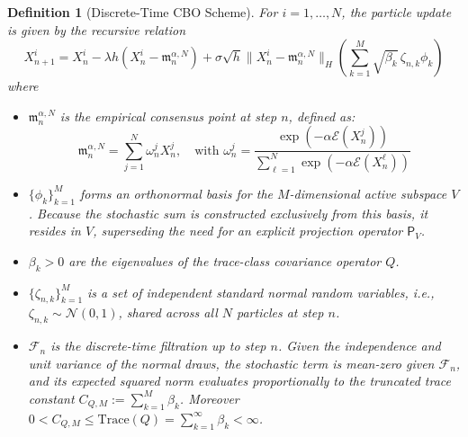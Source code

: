 \documentclass[12pt]{amsart}
\numberwithin{equation}{section}
\newtheorem{remark}[theorem]{Remark}
\newtheorem{definition}[theorem]{Definition}
\begin{document}
\begin{definition}[Discrete-Time CBO Scheme]\label{def}
For $i = 1, \dots, N$, the particle update is given by the recursive relation
\begin{equation}\label{eq:dynamics recursive}
    X_{n+1}^i = X_n^i - \lambda h (X_n^i - \mathfrak{m}_n^{\alpha, N}) + \sigma \sqrt{h} \|X_n^i - \mathfrak{m}_n^{\alpha, N}\|_H \left( \sum_{k=1}^M \sqrt{\beta_k}\, \zeta_{n,k} \phi_k \right)
\end{equation}
where
\begin{itemize}
    \item $\mathfrak{m}_n^{\alpha, N}$ is the empirical consensus point at step $n$, defined as:
    \begin{equation}
        \mathfrak{m}_n^{\alpha, N} = \sum_{j=1}^N \omega_n^j X_n^j, \quad \text{with } \omega_n^j = \frac{\exp(-\alpha \mathscr{E}(X_n^j))}{\sum_{\ell=1}^N \exp(-\alpha \mathscr{E}(X_n^\ell))}
    \end{equation}
    \item $\{\phi_k\}_{k=1}^M$ forms an orthonormal basis for the $M$-dimensional active subspace $V$. Because the stochastic sum is constructed exclusively from this basis, it resides in $V$, superseding the need for an explicit projection operator $\mathsf{P}_V$.
    \item $\beta_k > 0$ are the  eigenvalues of the trace-class covariance operator $Q$.
    \item $\{\zeta_{n,k}\}_{k=1}^M$ is a set of independent standard normal random variables, i.e., $\zeta_{n,k} \sim \mathcal{N}(0,1)$, shared across all $N$ particles at step $n$.
    \item $\mathcal{F}_n$ is the discrete-time filtration up to step $n$. Given the independence and unit variance of the normal draws, the stochastic term is mean-zero given $\mathcal{F}_n$, and its expected squared norm evaluates proportionally to the truncated trace constant $C_{Q,M} := \sum_{k=1}^M \beta_k$. Moreover $0< C_{Q,M}\leq \mathrm{Trace}(Q)=\sum_{k=1}^\infty \beta_k<\infty$.
\end{itemize}
\end{definition}

\end{document}
